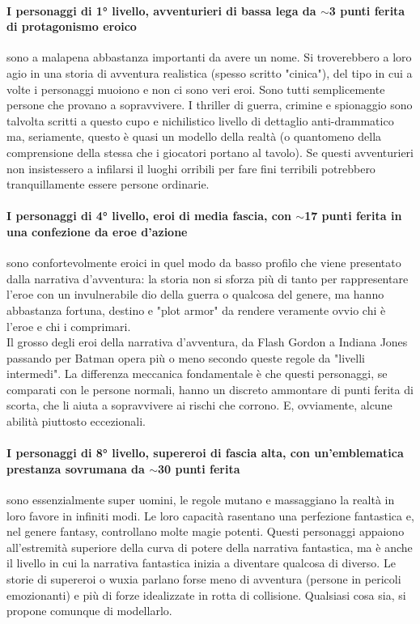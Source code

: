 \paragraph{I personaggi di 1° livello, avventurieri di bassa lega da $\sim$3 punti ferita di protagonismo eroico} sono a malapena abbastanza importanti da avere un nome. Si troverebbero a loro agio in una storia di avventura realistica (spesso scritto "cinica"), del tipo in cui a volte i personaggi muoiono e non ci sono veri eroi. Sono tutti semplicemente persone che provano a sopravvivere. I thriller di guerra, crimine e spionaggio sono talvolta scritti a questo cupo e nichilistico livello di dettaglio anti-drammatico ma, seriamente, questo è quasi un modello della realtà (o quantomeno della comprensione della stessa che i giocatori portano al tavolo). Se questi avventurieri non insistessero a infilarsi il luoghi orribili per fare fini terribili potrebbero tranquillamente essere persone ordinarie.

\paragraph{I personaggi di 4° livello, eroi di media fascia, con $\sim$17 punti ferita in una confezione da eroe d'azione} sono confortevolmente eroici in quel modo da basso profilo che viene presentato dalla narrativa d'avventura: la storia non si sforza più di tanto per rappresentare l'eroe con un invulnerabile dio della guerra o qualcosa del genere, ma hanno abbastanza fortuna, destino e "plot armor" da rendere veramente ovvio chi è l'eroe e chi i comprimari.\\
Il grosso degli eroi della narrativa d'avventura, da Flash Gordon a Indiana Jones passando per Batman opera più o meno secondo queste regole da "livelli intermedi". La differenza meccanica fondamentale è che questi personaggi, se comparati con le persone normali, hanno un discreto ammontare di punti ferita di scorta, che li aiuta a sopravvivere ai rischi che corrono. E, ovviamente, alcune abilità piuttosto eccezionali.

\paragraph{I personaggi di 8° livello, supereroi di fascia alta, con un'emblematica prestanza sovrumana da $\sim$30 punti ferita} sono essenzialmente super uomini, le regole mutano e massaggiano la realtà in loro favore in infiniti modi. Le loro capacità rasentano una perfezione fantastica e, nel genere fantasy, controllano molte magie potenti. Questi personaggi appaiono all'estremità superiore della curva di potere della narrativa fantastica, ma è anche il livello in cui la narrativa fantastica inizia a diventare qualcosa di diverso. Le storie di supereroi o wuxia parlano forse meno di avventura (persone in pericoli emozionanti) e più di forze idealizzate in rotta di collisione. Qualsiasi cosa sia, \dnd{} si propone comunque di modellarlo.

